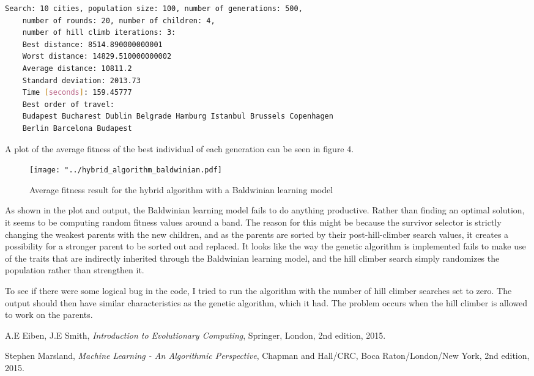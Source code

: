 \documentclass{article}
\begin{document}
\begin{lstlisting}[language=bash]
	Search: 10 cities, population size: 100, number of generations: 500, 
	number of rounds: 20, number of children: 4, 
	number of hill climb iterations: 3: 
	Best distance: 8514.890000000001
	Worst distance: 14829.510000000002
	Average distance: 10811.2
	Standard deviation: 2013.73
	Time [seconds]: 159.45777
	Best order of travel: 
	Budapest Bucharest Dublin Belgrade Hamburg Istanbul Brussels Copenhagen 
	Berlin Barcelona Budapest

\end{lstlisting}
\noindent
A plot of the average fitness of the best individual of each generation can be seen in figure 4.
\begin{figure}[H]
\begin{center}
\texttt{[image: "../hybrid\_algorithm\_baldwinian.pdf]}
\caption{Average fitness result for the hybrid algorithm with a Baldwinian learning model}
\end{center}
\end{figure}
As shown in the plot and output, the Baldwinian learning model fails to do anything productive. Rather than finding an optimal solution, it seems to be computing random fitness values around a band. The reason for this might be because the survivor selector is strictly changing the weakest parents with the new children, and as the parents are sorted by their post-hill-climber search values, it creates a possibility for a stronger parent to be sorted out and replaced. It looks like the way the genetic algorithm is implemented fails to make use of the traits that are indirectly inherited through the Baldwinian learning model, and the hill climber search simply randomizes the population rather than strengthen it.

To see if there were some logical bug in the code, I tried to run the algorithm with the number of hill climber searches set to zero. The output should then have similar characteristics as the genetic algorithm, which it had. The problem occurs when the hill climber is allowed to work on the parents.
\begin{thebibliography}{9}

  A.E Eiben, J.E Smith,
  \textit{Introduction to Evolutionary Computing},
  Springer, London,
  2nd edition,
  2015.
  
  Stephen Marsland,
  \textit{Machine Learning - An Algorithmic Perspective},
  Chapman and Hall/CRC, Boca Raton/London/New York,
  2nd edition,
  2015.

\end{thebibliography}
\end{document}
